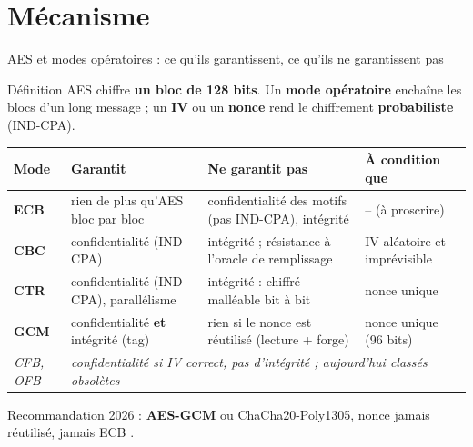 \documentclass[aspectratio=169,10pt]{beamer}
\begin{document}
\section{Mécanisme}

\begin{frame}{AES et modes opératoires : ce qu'ils garantissent, ce qu'ils ne garantissent pas}
  \begin{block}{Définition}
    \small AES \cite{fips197} chiffre \textbf{un bloc de 128 bits}. Un \textbf{mode opératoire} \cite{nist38a, nist38d}
    enchaîne les blocs d'un long message ; un \textbf{IV} ou un \textbf{nonce} rend le chiffrement \textbf{probabiliste} (IND-CPA).
  \end{block}
  \vspace{0.1em}
  \centering\scriptsize
  \begin{tabular}{p{1.3cm}p{3.6cm}p{4.0cm}p{3.6cm}}
    \toprule
    Mode & \textbf{Garantit} & \textbf{Ne garantit pas} & \textbf{À condition que} \\
    \midrule
    \textbf{ECB} & rien de plus qu'AES bloc par bloc & \textcolor{espred}{confidentialité des motifs} (pas IND-CPA), intégrité & -- (à proscrire) \\
    \textbf{CBC} & confidentialité (IND-CPA) & intégrité ; résistance à l'oracle de remplissage & IV \alert{aléatoire et imprévisible} \\
    \textbf{CTR} & confidentialité (IND-CPA), parallélisme & intégrité : chiffré \alert{malléable} bit à bit & nonce \alert{unique} \\
    \textbf{GCM} & confidentialité \textbf{et} \textcolor{espgreen}{intégrité} (tag) & rien si le nonce est réutilisé (lecture + forge) & nonce \alert{unique} (96 bits) \\
    \midrule
    \textit{CFB, OFB} & \multicolumn{3}{l}{\textit{confidentialité si IV correct, pas d'intégrité ; aujourd'hui classés obsolètes}} \\
    \bottomrule
  \end{tabular}
  \vspace{0.3em}

  \footnotesize Recommandation 2026 : \textbf{AES-GCM} ou ChaCha20-Poly1305, nonce jamais réutilisé, jamais ECB \cite{paar2024}.
\end{frame}
\end{document}
